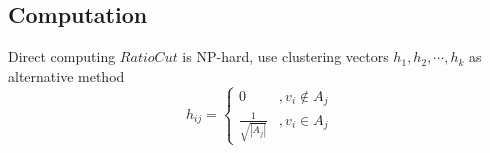 \documentclass[a4paper]{article}
\begin{document}
\subsection{Computation}
Direct computing $RatioCut$ is NP-hard, use clustering vectors ${h_1, h_2, \cdots, h_k}$ as alternative method
\begin{equation*}
    h_{ij} =
    \left\{
    \begin{array}{lr}
        0                      & , v_i \notin A_j \\
        \frac{1}{\sqrt{|A_j|}} & , v_i \in A_j
    \end{array}
    \right.
\end{equation*}
\end{document}
